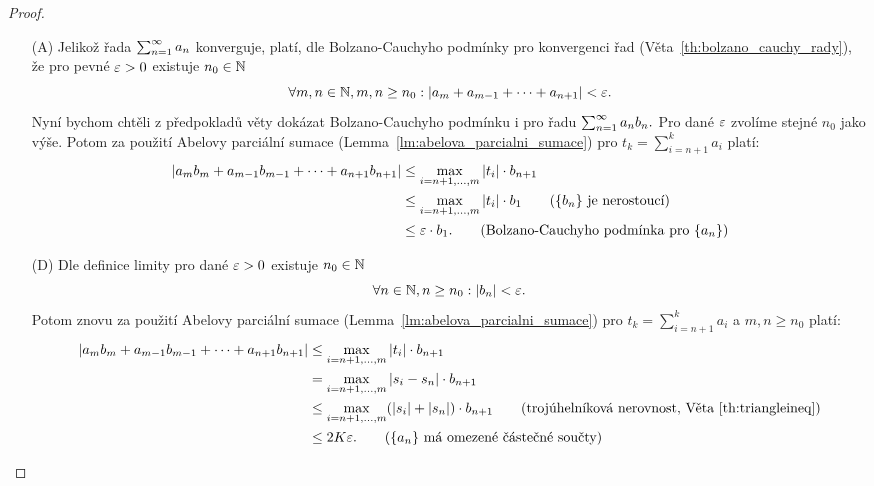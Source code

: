 \begin{proof}
    \leavevmode
    \begin{itemize}
        \item[(A)] Jelikož řada $\sum_{n=1}^\infty a_n$ konverguje, platí, dle Bolzano-Cauchyho
            podmínky pro konvergenci řad (Věta~\ref{th:bolzano_cauchy_rady}), že
            pro pevné $\varepsilon > 0$ existuje $n_0 \in \mathbb{N}$ \tz
            $$\forall m,n \in \mathbb{N}, m,n \geq n_0: |a_m + a_{m-1} + \dots + a_{n+1}| < \varepsilon.$$
            Nyní bychom chtěli z předpokladů věty dokázat Bolzano-Cauchyho podmínku 
            i pro řadu $\sum_{n=1}^\infty a_nb_n.$ Pro dané $\varepsilon$ zvolíme stejné $n_0$
            jako výše. Potom za použití Abelovy parciální sumace 
            (Lemma~\ref{lm:abelova_parcialni_sumace}) pro $t_k=\sum_{i=n+1}^ka_i$
            platí:
            \begin{align*}
                |a_mb_m + a_{m-1}b_{m-1} + \dots + a_{n+1}b_{n+1}|
                &\leq \max_{i=n+1, \dots, m}|t_i| \cdot b_{n+1} \\
                &\leq \max_{i=n+1, \dots, m}|t_i| \cdot b_1 
                    \tag{$\seq{b_n}$ je nerostoucí} \\
                &\leq \e \cdot b_1.
                    \tag{Bolzano-Cauchyho podmínka pro $\seq{a_n}$}
            \end{align*}
            
        \item[(D)] 
            Dle definice limity pro dané $\varepsilon> 0$ existuje $n_0 \in \mathbb{N}$ \tz
            $$\forall n \in \mathbb{N},
            n\geq n_0: |b_n| < \varepsilon.$$ Potom znovu za použití Abelovy parciální sumace 
            (Lemma~\ref{lm:abelova_parcialni_sumace}) pro $t_k=\sum_{i=n+1}^ka_i$
            a $m,n\geq n_0$ platí:
            \begin{align*}
                |a_mb_m + a_{m-1}b_{m-1} + \dots + a_{n+1}b_{n+1}|
                &\leq \max_{i=n+1, \dots, m}|t_i| \cdot b_{n+1} \\
                &= \max_{i=n+1, \dots, m}|s_i -s_n| \cdot b_{n+1} \\
                &\leq \max_{i=n+1, \dots, m}(|s_i| + |s_n|) \cdot b_{n+1}
                    \tag{trojúhelníková nerovnost, Věta~\ref{th:triangleineq}} \\
                &\leq 2K\e.
                    \tag{$\seq{a_n}$ má omezené částečné součty}
            \end{align*}
    \end{itemize}
\end{proof}


